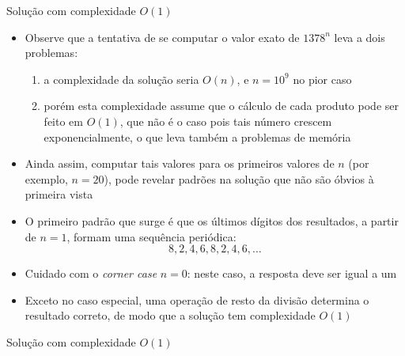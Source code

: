 \begin{frame}[fragile]{Solução com complexidade $O(1)$}

    \begin{itemize}
        \item Observe que a tentativa de se computar o valor exato de $1378^n$ leva a dois
            problemas:
            \begin{enumerate}
                \item a complexidade da solução seria $O(n)$, e $n = 10^{9}$ no pior caso

                \item porém esta complexidade assume que o cálculo de cada produto pode ser
                    feito em $O(1)$, que não é o caso pois tais número crescem exponencialmente,
                    o que leva também a problemas de memória 
            \end{enumerate}

        \item Ainda assim, computar tais valores para os primeiros valores de $n$ (por exemplo,
            $n = 20$), pode revelar padrões na solução que não são óbvios à primeira vista

        \item O primeiro padrão que surge é que os últimos dígitos dos resultados, a partir de
            $n = 1$, formam uma sequência periódica: 
            \[
                8, 2, 4, 6, 8, 2, 4, 6, \ldots
            \] 

        \item Cuidado com o \textit{corner case} $n = 0$: neste caso, a resposta deve ser igual
            a um 

        \item Exceto no caso especial, uma operação de resto da divisão determina o 
            resultado correto, de modo que a solução tem complexidade $O(1)$
   \end{itemize}

\end{frame}

\begin{frame}[fragile]{Solução com complexidade $O(1)$}
\end{frame}
